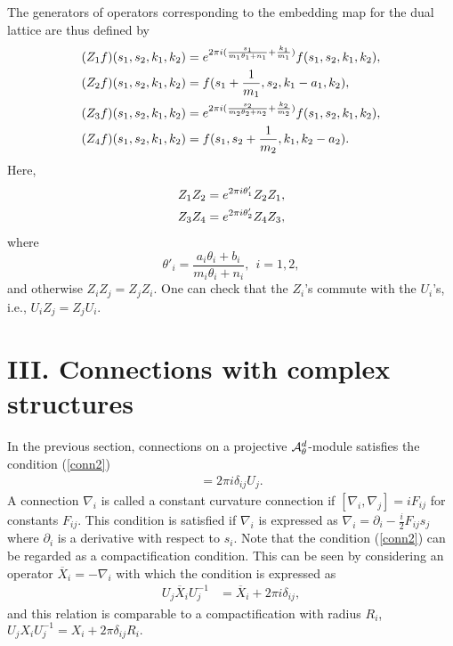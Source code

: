 \documentclass[12pt, a4paper]{article}
\begin{document}
The generators of operators corresponding to the embedding map for
the dual lattice are thus defined by
\begin{align} \label{zop}
(Z_1f)(s_1,s_2,k_1,k_2)&=e^{2\pi i(\frac{s_1}{m_1 \theta_1 +n_1}
  + \frac{k_1}{m_1} )} f(s_1,s_2,k_1,k_2), \notag \\
(Z_2f)(s_1,s_2,k_1,k_2)&= f(s_1 + \frac{1}{m_1},s_2,k_1 -a_1,k_2), \notag \\
(Z_3f)(s_1,s_2,k_1,k_2)&=e^{2\pi i(\frac{s_2}{m_2 \theta_2 +n_2}
  + \frac{k_2}{m_2} )}  f(s_1,s_2,k_1,k_2), \notag \\
(Z_4f)(s_1,s_2,k_1,k_2)&=  f(s_1,s_2 + \frac{1}{m_2},k_1,k_2-a_2).
\end{align}
Here,
\begin{align} \label{zcomm}
Z_1Z_2 &=e^{2\pi i \theta'_1}Z_2Z_1, \notag \\
Z_3Z_4 &=e^{2\pi i \theta'_2}Z_4Z_3,
\end{align}
%
where \begin{equation} \label{thetap}
\theta'_i = \frac{a_i
\theta_i + b_i}{m_i \theta_i + n_i } , \ \ i=1,2 ,
\end{equation}
 and otherwise $Z_i Z_j = Z_j Z_i$. One can check that the
$Z_i$'s commute with the $U_i$'s, i.e., $ U_iZ_j =Z_j U_i .$



\section*{III. Connections with complex structures }

In the previous section, connections on a projective ${\cal
A}_\theta^d$-module satisfies the condition (\ref{conn2})
\begin{align*}
[\nabla_i,U_j]=2\pi i\delta_{ij} U_j .
\end{align*}
A connection $ \nabla_i$ is called a constant curvature connection
if $ [ \nabla_i , \nabla_j ] = i F_{ij}$ for  constants $F_{ij}$.
 This condition is satisfied if $ \nabla_i $
is expressed as $ \nabla_i = \partial_i - \frac{i}{2}F_{ij} s_j $
where $\partial_i $ is a derivative with respect to $s_i$. Note
that the condition (\ref{conn2}) can be regarded as a
compactification condition. This can be seen by considering an
operator $\overline{X}_i = - \nabla_i$ with which the condition is
expressed as
\begin{align} \label{Xi}
 U_j \overline{X}_i U_j^{-1} &= \overline{X}_i
+ 2 \pi i \delta_{ij}, \end{align}
and this relation is comparable
to a compactification with radius $R_i$,
 $ U_j X_i U_j^{-1} = X_i + 2 \pi  \delta_{ij} R_i .$
\end{document}
